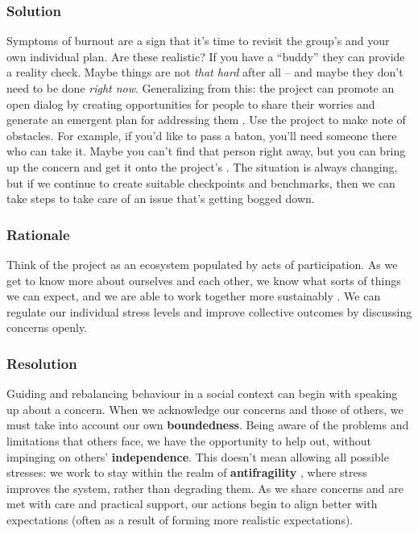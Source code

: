 \subsubsection*{Solution}

Symptoms of burnout are a sign that it's time to revisit the group's  and your own individual plan.  Are these realistic?  If you have a ``buddy'' they can provide a reality check.   Maybe things are not \emph{that hard} after all -- and maybe they don't need to be done \emph{right now}.  Generalizing from this: the project can promote an open dialog by creating opportunities for people to share their worries and generate an emergent plan for addressing them \cite{seikkula2006dialogical}.  Use the project  to make note of obstacles.  For example, if you'd like to pass a baton, you'll need someone there who can take it.  Maybe you can't find that person right away, but you can bring up the concern and get it onto the project's .  The situation is always changing, but if we continue to create suitable checkpoints and benchmarks, then we can take steps to take care of an issue that's getting bogged down.    

\subsubsection*{Rationale}

Think of the project as an ecosystem populated by acts of participation.  As we get to know more about ourselves and each other, we know what sorts of things we can expect, and we are able to work together more sustainably \cite{ostrom2010revising}.
%
We can regulate our individual stress levels and improve collective outcomes by discussing concerns openly.

\subsubsection*{Resolution}

Guiding and rebalancing behaviour in a social context can begin with speaking up about a concern.  When we acknowledge our concerns and those of others, we must take into account our own \textbf{boundedness}.  Being aware of the problems and limitations that others face, we have the opportunity to help out, without impinging on others' \textbf{independence}.   This doesn't mean allowing all possible stresses: we work to stay within the realm of \textbf{antifragility} \cite{taleb2012antifragile}, where stress improves the system, rather than degrading them. 
%
As we share concerns and are met with care and practical support, our actions begin to align better with expectations (often as a result of forming more realistic expectations). 

